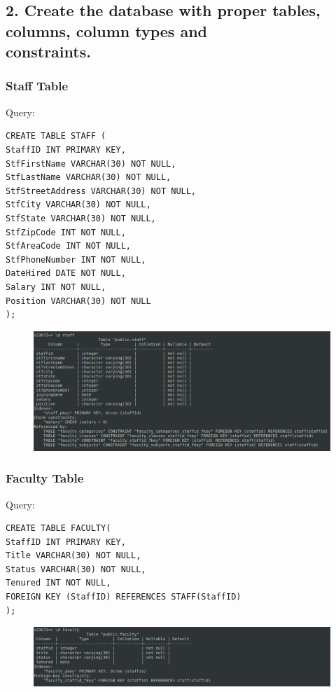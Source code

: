 \documentclass{article}
\begin{document}
\subsection*{2. Create the database with proper tables, columns, column types and \\
constraints.}

\subsubsection*{Staff Table}
Query:
\begin{Verbatim}[frame=single,framerule=1pt,fontfamily=courier,fontsize=\small]
CREATE TABLE STAFF (
StaffID INT PRIMARY KEY,
StfFirstName VARCHAR(30) NOT NULL,
StfLastName VARCHAR(30) NOT NULL,
StfStreetAddress VARCHAR(30) NOT NULL,
StfCity VARCHAR(30) NOT NULL,
StfState VARCHAR(30) NOT NULL,
StfZipCode INT NOT NULL,
StfAreaCode INT NOT NULL,
StfPhoneNumber INT NOT NULL,
DateHired DATE NOT NULL,
Salary INT NOT NULL,
Position VARCHAR(30) NOT NULL
);
\end{Verbatim}
\begin{figure}[H]
    \centering
    \includegraphics[width=\textwidth]{schema/staff.png}
\end{figure}

\subsubsection*{Faculty Table}
Query:
\begin{Verbatim}[frame=single,framerule=1pt,fontfamily=courier,fontsize=\small]
CREATE TABLE FACULTY(
StaffID INT PRIMARY KEY,
Title VARCHAR(30) NOT NULL,
Status VARCHAR(30) NOT NULL,
Tenured INT NOT NULL,
FOREIGN KEY (StaffID) REFERENCES STAFF(StaffID)
);
\end{Verbatim}
\begin{figure}[H]
    \centering
    \includegraphics[width=\textwidth]{schema/faculty.png}
\end{figure}
\end{document}
